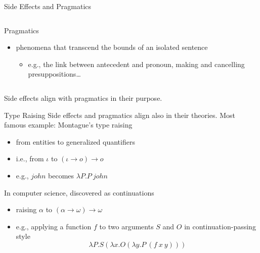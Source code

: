 \documentclass{beamer}
\begin{document}
\begin{frame}{Side Effects and Pragmatics}
\begin{columns}
\begin{column}{0.5\textwidth}
\begin{block}{Pragmatics}
\begin{itemize}
\begin{itemize}
          \end{itemize}
        \pause \vfill
        \item phenomena that transcend the bounds of an isolated sentence
          \begin{itemize}
          \item e.g., the link between antecedent and pronoun, making and
            cancelling presuppositions\ldots
          \end{itemize}
        \end{itemize}
      \end{block}
    \end{column}
  \end{columns}
  \vfill
  \pause
  \alert{Side effects align with pragmatics in their purpose.}
\end{frame}

\begin{frame}{Type Raising}
  Side effects and pragmatics align also in their theories.
  \pause
  \vfill
  Most famous example: Montague's type raising
  \begin{itemize}
  \item from entities to generalized quantifiers
  \item i.e., from $\iota$ to $(\iota \to o) \to o$
  \item e.g., $john$ becomes $\lambda P. P\ john$
  \end{itemize}
  \vfill
  \pause
  In computer science, discovered as continuations
  \begin{itemize}
  \item raising $\alpha$ to $(\alpha \to \omega) \to \omega$
  \item e.g., applying a function $f$ to two arguments $S$ and $O$ in
    continuation-passing style
    $$ \lambda P. S (\lambda x. O (\lambda y. P\ (f\ x\ y))) $$
  \end{itemize}
\end{frame}
\end{document}
